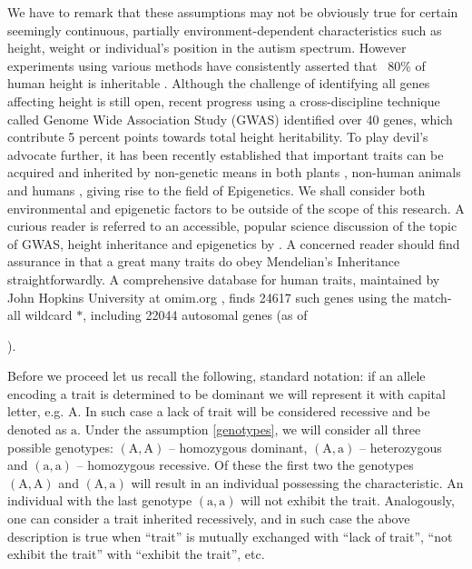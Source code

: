 \documentclass{l4proj}
\newcommand{\genotype}[2]{\ensuremath{(\mathrm{#1}, \mathrm{#2})}}
\begin{document}
We have to remark that these assumptions may not be obviously true for certain seemingly continuous, partially environment-dependent characteristics such as height, weight or individual's position in the autism spectrum. However experiments using various methods have consistently asserted that ~80\% of human height is inheritable \parencite{heightTwins, heightJustSiblings}. Although the challenge of identifying all genes affecting height is still open, recent progress using a cross-discipline technique called Genome Wide Association Study (GWAS) identified over 40 genes, which contribute 5 percent points towards total height heritability. To play devil's advocate further, it has been recently established that important traits can be acquired and inherited by non-genetic means in both plants \parencite{palmOilKernel}, non-human animals \parencite{dolinoy_maternal_2007} and humans \parencite{yehuda_holocaust_2015}, giving rise to the field of Epigenetics. We shall consider both environmental and epigenetic factors to be outside of the scope of this research. A curious reader is referred to an accessible, popular science discussion of the topic of GWAS, height inheritance and epigenetics by \textcite{GWASDiscussion}. A concerned reader should find assurance in that a great many traits do obey Mendelian's Inheritance straightforwardly. A comprehensive database for human traits, maintained by John Hopkins University at omim.org \parencite{omim16}, finds 24617 such genes using the match-all wildcard $*$, including 22044 \gls{autosomal} genes (as of \date{March 13, 2016}).

Before we proceed let us recall the following, standard notation: if an \gls{allele} encoding a trait is determined to be \gls{dominant} we will represent it with capital letter, e.g. $\mathrm{A}$. In such case a lack of trait will be considered \gls{recessive} and be denoted as $\mathrm{a}$. Under the assumption \ref{genotypes}, we will consider all three possible genotypes: \genotype{A}{A} -- homozygous dominant, \genotype{A}{a} -- heterozygous and \genotype{a}{a} -- homozygous recessive. Of these the first two the genotypes \genotype{A}{A} and \genotype{A}{a} will result in an individual possessing the characteristic. An individual with the last genotype \genotype{a}{a} will not exhibit the trait. Analogously, one can consider a trait inherited recessively, and in such case the above description is true when ``trait'' is mutually exchanged with ``lack of trait'', ``not exhibit the trait'' with ``exhibit the trait'', etc.
\end{document}
